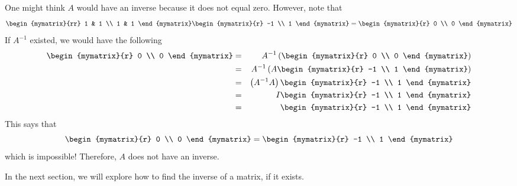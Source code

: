 \begin{solution} One might think $A$ would have an inverse because it does not equal zero.
However, note that 
\begin{equation*}
\begin{mymatrix}{rr}
1 & 1 \\
1 & 1
\end{mymatrix} \begin{mymatrix}{r}
-1 \\
1
\end{mymatrix} =\begin{mymatrix}{r}
0 \\
0
\end{mymatrix}
\end{equation*}
If $A^{-1}$ existed, we would have the following
\begin{eqnarray*}
\begin{mymatrix}{r}
0 \\
0
\end{mymatrix} &=& A^{-1}\tup{\begin{mymatrix}{r}
0 \\
0
\end{mymatrix} } \\
&=& A^{-1}\tup{A\begin{mymatrix}{r}
-1 \\
1
\end{mymatrix} } \\
&=&\tup{A^{-1}A} \begin{mymatrix}{r}
-1 \\
1
\end{mymatrix} \\
&=&I\begin{mymatrix}{r}
-1 \\
1
\end{mymatrix} \\
&=&\begin{mymatrix}{r}
-1 \\
1
\end{mymatrix}
\end{eqnarray*}
This says that 
\begin{equation*}
\begin{mymatrix}{r}
0 \\
0
\end{mymatrix}
=
\begin{mymatrix}{r}
-1 \\
1
\end{mymatrix}
\end{equation*}
which is impossible! Therefore, $A$ does not have an inverse. 
\end{solution}

In the next section, we will explore how to find the inverse of a matrix, if it exists. 
